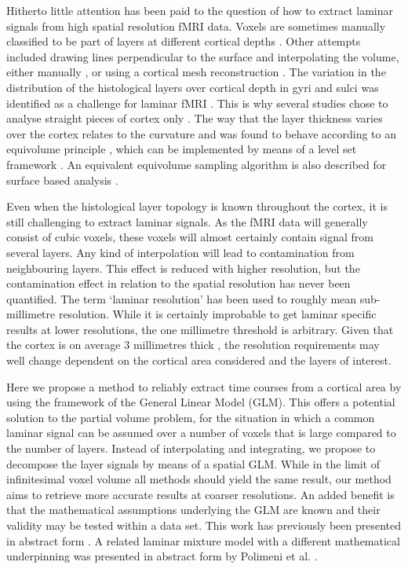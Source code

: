 Hitherto little attention has been paid to the question of how to extract laminar signals from high spatial resolution fMRI data. Voxels are sometimes manually classified to be part of layers at different cortical depths \cite[e.g.]{Siero2011,Olman2012,Maass2014}. Other attempts included drawing lines perpendicular to the surface and interpolating the volume, either manually \cite{Geyer1999,Koopmans2010}, or using a cortical mesh reconstruction \cite[e.g.]{Koopmans2011,Polimeni2010,DeMartino2013}.
The variation in the distribution of the histological layers over cortical depth in gyri and sulci was identified as a challenge for laminar fMRI \cite{Ress2007}. This is why several studies chose to analyse straight pieces of cortex only \cite{Koopmans2010,Olman2012,DeMartino2013}. The way that the layer thickness varies over the cortex relates to the curvature and was found to behave according to an equivolume principle \cite{Bok1929,Waehnert2014}, which can be implemented by means of a level set framework \cite{Sethian1999}. An equivalent equivolume sampling algorithm is also described for surface based analysis \cite{Kleinnijenhuis2015}.

Even when the histological layer topology is known throughout the cortex, it is still challenging to extract laminar signals. As the fMRI data will generally consist of cubic voxels, these voxels will almost certainly contain signal from several layers. Any kind of interpolation will lead to contamination from neighbouring layers. This effect is reduced with higher resolution, but the contamination effect in relation to the spatial resolution has never been quantified. The term `laminar resolution' \cite{Ugurbil2012,Huber2015} has been used to roughly mean sub-millimetre resolution. While it is certainly improbable to get laminar specific results at lower resolutions, the one millimetre threshold is arbitrary. Given that the cortex is on average 3 millimetres thick \cite{Zilles1990,Fischl2000}, the resolution requirements may well change dependent on the cortical area considered and the layers of interest. 

Here we propose a method to reliably extract time courses from a cortical area by using the framework of the General Linear Model (GLM). This offers a potential solution to the partial volume problem, for the situation in which a common laminar signal can be assumed over a number of voxels that is large compared to the number of layers. Instead of interpolating and integrating, we propose to decompose the layer signals by means of a spatial GLM. While in the limit of infinitesimal voxel volume all methods should yield the same result, our method aims to retrieve more accurate results at coarser resolutions. An added benefit is that the mathematical assumptions underlying the GLM are known and their validity may be tested within a data set. This work has previously been presented in abstract form \cite{VanMourikISMRM2015}. A related laminar mixture model with a different mathematical underpinning was presented in abstract form by Polimeni et al. \cite{PolimeniISMRM2010}.
 
